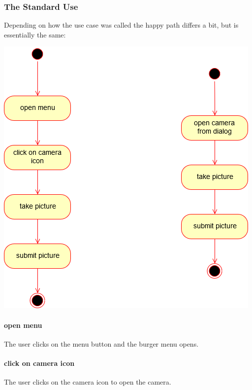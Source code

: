     \subsubsection{The Standard Use}
        
        Depending on how the use case was called the happy path differs a bit, but is essentially the same:
        
       \begin{center}
            \includegraphics[scale=0.49]{SystemSpec/Usecases/Diagrams/ScanSkinActivity1.png}\\
       \end{center}{}
        
        \paragraph{open menu}
        The user clicks on the menu button and the burger menu opens.
        
        \paragraph{click on camera icon}
        The user clicks on the camera icon to open the camera.
        
